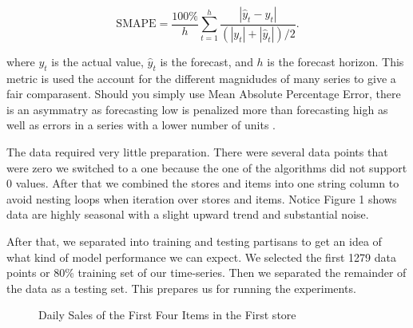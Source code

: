\documentclass[16pt,twocolumn,letterpaper]{article}
\begin{document}
\begin{equation}
\textrm{SMAPE}={\frac {100\%}{h}}\sum _{t=1}^{h}{\frac {\left|\hat{y}_t-y_t\right|}{(|y_t|+|\hat{y}_t|)/2}}.
\end{equation}

where $y_t$ is the actual value, $\hat{y}_t$ is the forecast, and $h$ is the forecast horizon. This metric is used the account for the different magnidudes of many series to give a fair comparasent. Should you simply use Mean Absolute Percentage Error, there is an asymmatry as forecasting low is penalized more than forecasting high as well as errors in a series with a lower number of units \cite{hyndman2006another}.

The data required very little preparation. There were several data points that were zero we switched to a one because the one of the algorithms did not support 0 values. After that we combined the stores and items into one string column to avoid nesting loops when iteration over stores and items. Notice Figure 1 shows data are highly seasonal with a slight upward trend and substantial noise.

After that, we separated into training and testing partisans to get an idea of what kind of model performance we can expect. We selected the first 1279 data points or 80\% training set of our time-series. Then we separated the remainder of the data as a testing set. This prepares us for running the experiments.

\begin{figure}[!htb]
	\caption{\label{fig:my-label} Daily Sales of the First Four Items in the First store}
\end{figure}
\end{document}
